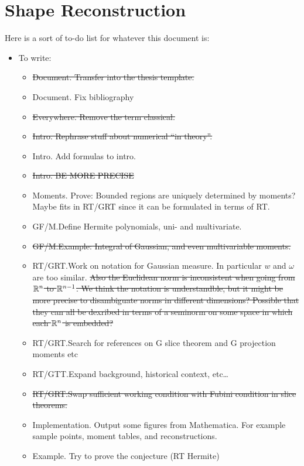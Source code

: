 


\section{Shape Reconstruction}
Here is a sort of to-do list for whatever this document is:
\begin{itemize}
\item To write:
\begin{itemize}
\item \sout{Document. Transfer into the thesis template.}
\item Document. Fix bibliography
\item \sout{Everywhere. Remove the term classical.}
\item \sout{Intro. Rephrase stuff about numerical ``in theory''.}
\item Intro. Add formulas to intro.
\item \sout{Intro. BE MORE PRECISE}
\item Moments. Prove: Bounded regions are uniquely determined by moments? Maybe fits in RT/GRT since it can be formulated in terms of RT.\@
\item GF/M.\@ Define Hermite polynomials, uni- and multivariate.
\item \sout{GF/M.\@ Example: Integral of Gaussian, and even multivariable moments.}
\item RT/GRT.\@ Work on notation for Gaussian measure. In particular $w$ and $\omega$ are too similar. \sout{Also the Euclidean norm is inconsistent when going from $\mathbb{R}^n$ to $\mathbb{R}^{n-1}$. We think the notation is understandble, but it might be more precise to disambiguate norms in different dimensions? Possible that they can all be dexribed in terms of a seminorm on some space in which each $\mathbb{R}^n$ is embedded?} 
\item RT/GRT.\@ Search for references on G slice theorem and G projection moments etc
\item RT/GTT.\@ Expand background, historical context, etc\ldots
\item \sout{RT/GRT.\@ Swap sufficient working condition with Fubini condition in slice theorems.}
\item Implementation. Output some figures from Mathematica. For example sample points, moment tables, and reconstructions.
\item Example. Try to prove the conjecture (RT Hermite)
\end{itemize}


\end{itemize}
